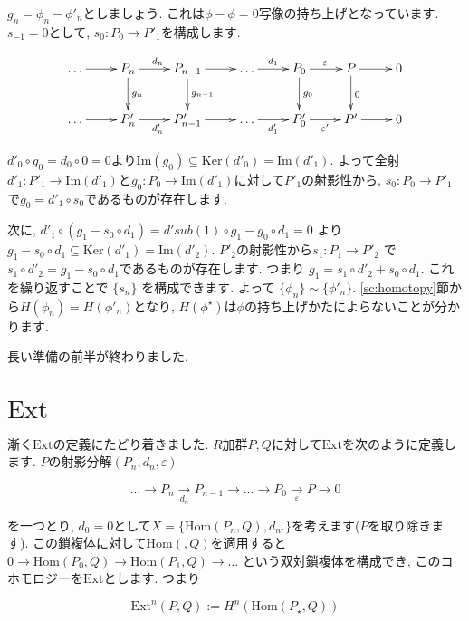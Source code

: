 \documentclass{jsarticle}
\def\Im{\mathrm{Im}}
\def\Ker{\mathrm{Ker}}
\def\Hom{\mathrm{Hom}}
\def\Ext{\mathrm{Ext}}
\theoremstyle{definition}
\numberwithin{theorem}{section}
\begin{document}
$g_n = \phi_n - \phi'_n$としましょう. これは$\phi-\phi = 0$写像の持ち上げとなっています. $s_{-1} = 0$として,
$s_0: P_0 \rightarrow P'_1$を構成します. 

\begin{equation*}
\xymatrix{
  \ldots \ar[r] & P_n \ar[r]^{d_n} \ar[d]^{g_n} & P_{n-1} \ar[r] \ar[d]^{g_{n-1}} & \ldots \ar[r]^{d_1} & P_0 \ar[r]^{\varepsilon} \ar[d]^{g_0} & P \ar[r] \ar[d]^{0} & 0 \\
  \ldots \ar[r] & P'_n \ar[r]_{d'_n} & P'_{n-1} \ar[r]& \ldots \ar[r]_{d'_1}& P'_0 \ar[r]_{\varepsilon'} & P' \ar[r]& 0
}
\end{equation*}

$d'_0\circ g_0 = d_0\circ 0 = 0$より$\Im(g_0) \subseteq \Ker(d'_0) = \Im(d'_1)$. よって全射
$d'_1: P'_1 \rightarrow \Im(d'_1)$と$g_0: P_0 \rightarrow \Im(d'_1)$に対して$P'_1$の射影性から, 
$s_0: P_0 \rightarrow P'_1$で$g_0 = d'_1 \circ s_0$であるものが存在します.

次に, $d'_1\circ(g_1 - s_0\circ d_1) = d'sub(1)\circ g_1 - g_0 \circ d_1 = 0$ より
$g_1 - s_0 \circ d_1 \subseteq \Ker(d'_1) = \Im(d'_2)$.
$P'_2$の射影性から$s_1: P_1 \rightarrow P'_2$ で $s_1\circ d'_2 = g_1 - s_0\circ d_1$であるものが存在します. つまり
$g_1 = s_1\circ d'_2 + s_0\circ d_1$. これを繰り返すことで $\{s_n\}$ を構成できます. よって $\{\phi_n\} \sim \{\phi'_n\}$.
\ref{sc:homotopy}節から$H(\phi_n) = H(\phi'_n)$となり, $H(\phi^\star)$は$\phi$の持ち上げかたによらないことが分かります.

長い準備の前半が終わりました.

\section{$\Ext$}
漸く$\Ext$の定義にたどり着きました.
$R$加群$P, Q$に対して$\Ext$を次のように定義します. $P$の射影分解$(P_n, d_n, \varepsilon)$

\begin{equation*}
\ldots \rightarrow P_n \xrightarrow[d_n]{} P_{n-1} \rightarrow \ldots \rightarrow P_0 \xrightarrow[\varepsilon]{} P \rightarrow 0
\end{equation*}

を一つとり, $d_0 = 0$として$X = \{\Hom(P_n, Q), d_{n^\star}\}$を考えます($P$を取り除きます).
この鎖複体に対して$\Hom(, Q)$を適用すると$0\rightarrow \Hom(P_0, Q) \rightarrow \Hom(P_1, Q) \rightarrow \ldots$
という双対鎖複体を構成でき, このコホモロジーを$\Ext$とします. つまり

\begin{equation*}
\Ext^n(P, Q) := H^n(\Hom(P_\star, Q))
\end{equation*}
\end{document}
